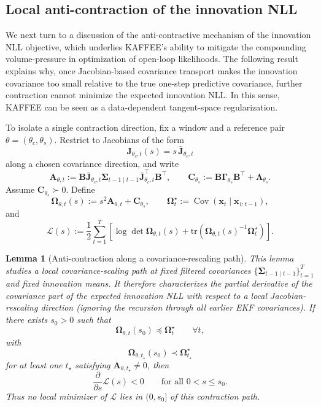 \documentclass{article}
\theoremstyle{plain}
\newtheorem{Lemma}{Lemma}
\theoremstyle{definition}
\theoremstyle{remark}
\newcommand{\tr}{\mathrm{tr}}
\begin{document}
\subsection{Local anti-contraction of the innovation NLL}
\label{app:anti_contraction}

We next turn to a discussion of the anti-contractive mechanism of the innovation NLL objective, which underlies KAFFEE's ability to mitigate the compounding volume-pressure in optimization of open-loop likelihoods. The following result explains why, once Jacobian-based covariance transport makes the innovation covariance too small relative to the true one-step predictive covariance, further contraction cannot minimize the expected innovation NLL. In this sense, KAFFEE can be seen as a data-dependent tangent-space regularization.

To isolate a single contraction direction, fix a window and a reference pair $\theta=(\theta_c,\theta_s)$. Restrict to
Jacobians of the form
\[
\bm J_{\theta_c,t}(s)=s\,\bar{\bm J}_{\theta_c,t}
\]
along a chosen covariance direction, and write
\[
\bm A_{\theta,t}
:=
\bm B\bar{\bm J}_{\theta_c,t}
\bm \Sigma_{t-1\mid t-1}
\bar{\bm J}_{\theta_c,t}^{\top}\bm B^\top,
\qquad
\bm C_{\theta_s}
:=
\bm B\bm\Gamma_{\theta_s}\bm B^\top+\bm\Lambda_{\theta_s}.
\]
Assume $\bm C_{\theta_s}\succ0$. Define
\[
\bm\Omega_{\theta,t}(s):=s^2\bm A_{\theta,t}+\bm C_{\theta_s},
\qquad
\bm\Omega_t^\star:=\operatorname{Cov}(\bm x_t\mid \bm x_{1:t-1}),
\]
and
\[
\mathcal L(s)
:=
\frac12\sum_{t=1}^T
\left[
\log\det \bm\Omega_{\theta,t}(s)
+
\tr \left(
\bm\Omega_{\theta,t}(s)^{-1}\bm\Omega_t^\star
\right)
\right].
\]

\begin{Lemma}[Anti-contraction along a covariance-rescaling path]	
\label{lem:anti_contraction}
This lemma studies a local covariance-scaling path at fixed filtered covariances $\{\bm\Sigma_{t-1\mid t-1}\}_{t=1}^T$ and fixed innovation means. It therefore characterizes the partial derivative of the covariance part of the expected innovation NLL with respect to a local Jacobian-rescaling direction (ignoring the recursion through all earlier EKF covariances).
If there exists $s_0>0$ such that
\[
\bm\Omega_{\theta,t}(s_0)\preceq \bm\Omega_t^\star
\qquad \forall t,
\]
with
\[
\bm\Omega_{\theta,t_\star}(s_0)\prec \bm\Omega_{t_\star}^\star
\]
for at least one $t_\star$ satisfying $\bm A_{\theta,t_\star}\neq0$, then
\[
\frac{\partial}{\partial s}\mathcal L(s)<0
\qquad
\text{for all }0<s\le s_0.
\]
Thus no local minimizer of $\mathcal L$ lies in $(0,s_0]$ of this contraction path.
\end{Lemma}
\end{document}

